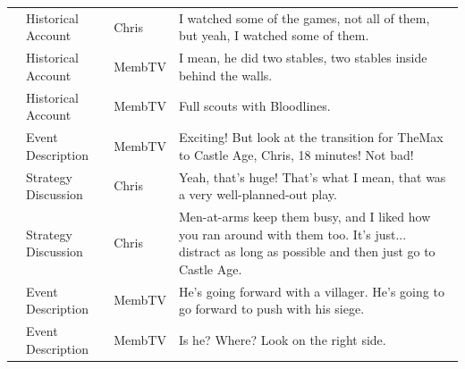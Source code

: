 {\begin{longtable}{@{}>{\theAppRow}r|L{2.3cm}L{1.0cm}U{11.55cm}@{}}
    & Historical Account    & Chris        & I watched some of the games, not all of them, but yeah, I watched some of them.                                                                                                                                                                                  \\
    & Historical Account    & MembTV       & I mean, he did two stables, two stables inside behind the walls.                                                                                                                                                                                                 \\
    & Historical Account    & MembTV       & Full scouts with Bloodlines.                                                                                                                                                                                                                                     \\
    & Event Description     & MembTV       & Exciting! But look at the transition for TheMax to Castle Age, Chris, 18 minutes! Not bad!                                                                                                                                                                       \\
    & Strategy Discussion   & Chris        & Yeah, that's huge! That's what I mean, that was a very well-planned-out play.                                                                                                                                                                                    \\
    & Strategy Discussion   & Chris        & Men-at-arms keep them busy, and I liked how you ran around with them too. It's just... distract as long as possible and then just go to Castle Age.                                                                                                              \\
    & Event Description     & MembTV       & He's going forward with a villager. He's going to go forward to push with his siege.                                                                                                                                                                             \\
    & Event Description     & MembTV       & Is he? Where? Look on the right side.                                                                                                                                                                                                                            \\

\end{longtable}}
